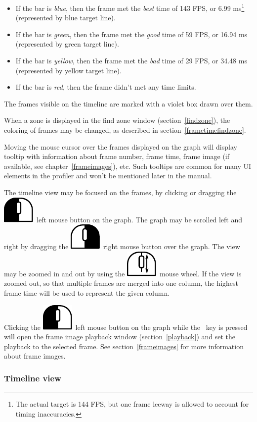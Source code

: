 \documentclass[hidelinks,titlepage,a4paper]{article}
\newcommand{\LMB}{\includegraphics[height=.8\baselineskip]{icons/lmb}}
\newcommand{\RMB}{\includegraphics[height=.8\baselineskip]{icons/rmb}}
\newcommand{\Scroll}{\includegraphics[height=.8\baselineskip]{icons/scroll}}
\begin{document}
\begin{itemize}
\item If the bar is \emph{blue}, then the frame met the \emph{best} time of 143 FPS, or 6.99 \si{\milli\second}\footnote{The actual target is 144 FPS, but one frame leeway is allowed to account for timing inaccuracies.} (represented by blue target line).
\item If the bar is \emph{green}, then the frame met the \emph{good} time of 59 FPS, or 16.94 \si{\milli\second} (represented by green target line).
\item If the bar is \emph{yellow}, then the frame met the \emph{bad} time of 29 FPS, or 34.48 \si{\milli\second} (represented by yellow target line).
\item If the bar is \emph{red}, then the frame didn't met any time limits.
\end{itemize}

The frames visible on the timeline are marked with a violet box drawn over them.

When a zone is displayed in the find zone window (section~\ref{findzone}), the coloring of frames may be changed, as described in section~\ref{frametimefindzone}.

Moving the \faMousePointer{} mouse cursor over the frames displayed on the graph will display tooltip with information about frame number, frame time, frame image (if available, see chapter~\ref{frameimages}), etc. Such tooltips are common for many UI elements in the profiler and won't be mentioned later in the manual.

The timeline view may be focused on the frames, by clicking or dragging the \LMB{}~left mouse button on the graph. The graph may be scrolled left and right by dragging the \RMB{}~right mouse button over the graph. The view may be zoomed in and out by using the \Scroll{}~mouse wheel. If the view is zoomed out, so that multiple frames are merged into one column, the highest frame time will be used to represent the given column.

Clicking the \LMB{}~left mouse button on the graph while the \keys{\ctrl}~key is pressed will open the frame image playback window (section~\ref{playback}) and set the playback to the selected frame. See section~\ref{frameimages} for more information about frame images.

\subsubsection{Timeline view}
\end{document}
